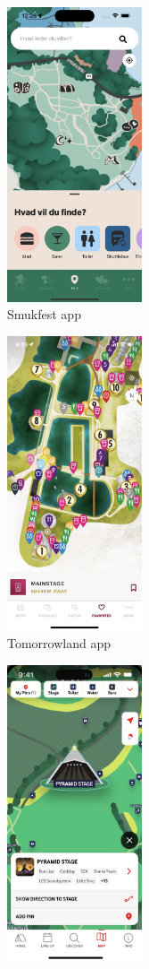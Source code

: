 \begin{figure}
  \centering
  \begin{subfigure}{.3\textwidth}
    \centering
    \includegraphics[width=4cm]{Pictures/Misc/smukfest_app.png}
    \caption{Smukfest app \cite{smukfest_app}}
    \label{fig:smukfest_app}
  \end{subfigure}%
  \begin{subfigure}{.3\textwidth}
    \centering
    \includegraphics[width=4cm]{Pictures/Misc/tomorrowland_app.png}
    \caption{Tomorrowland app \cite{tomorrowland_app}}
    \label{fig:tomorrowland_app}
  \end{subfigure}
  \begin{subfigure}{.3\textwidth}
    \centering
    \includegraphics[width=4cm]{Pictures/Misc/glastonbury_app.png}

\end{subfigure}
\end{figure}
